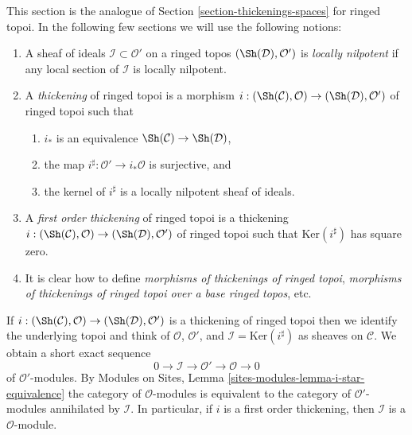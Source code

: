\noindent
This section is the analogue of Section \ref{section-thickenings-spaces}
for ringed topoi.
In the following few sections we will use the following notions:
\begin{enumerate}
\item A sheaf of ideals $\mathcal{I} \subset \mathcal{O}'$ on
a ringed topos $(\Sh(\mathcal{D}), \mathcal{O}')$ is {\it locally nilpotent}
if any local section of $\mathcal{I}$ is locally nilpotent.
\item A {\it thickening} of ringed topoi is a morphism
$i : (\Sh(\mathcal{C}), \mathcal{O}) \to (\Sh(\mathcal{D}), \mathcal{O}')$
of ringed topoi such that
\begin{enumerate}
\item $i_*$ is an equivalence $\Sh(\mathcal{C}) \to \Sh(\mathcal{D})$,
\item the map $i^\sharp : \mathcal{O}' \to i_*\mathcal{O}$
is surjective, and
\item the kernel of $i^\sharp$ is a locally nilpotent sheaf of ideals.
\end{enumerate}
\item A {\it first order thickening} of ringed topoi is a thickening
$i : (\Sh(\mathcal{C}), \mathcal{O}) \to (\Sh(\mathcal{D}), \mathcal{O}')$
of ringed topoi such that $\text{Ker}(i^\sharp)$ has square zero.
\item It is clear how to define
{\it morphisms of thickenings of ringed topoi},
{\it morphisms of thickenings of ringed topoi over a base ringed topos}, etc.
\end{enumerate}
If
$i : (\Sh(\mathcal{C}), \mathcal{O}) \to (\Sh(\mathcal{D}), \mathcal{O}')$
is a thickening of ringed topoi then we identify the underlying topoi
and think of $\mathcal{O}$, $\mathcal{O}'$, and
$\mathcal{I} = \text{Ker}(i^\sharp)$ as sheaves on $\mathcal{C}$.
We obtain a short exact sequence
$$
0 \to \mathcal{I} \to \mathcal{O}' \to \mathcal{O} \to 0
$$
of $\mathcal{O}'$-modules. By
Modules on Sites, Lemma \ref{sites-modules-lemma-i-star-equivalence}
the category of $\mathcal{O}$-modules is equivalent to the category
of $\mathcal{O}'$-modules annihilated by $\mathcal{I}$. In particular,
if $i$ is a first order thickening, then
$\mathcal{I}$ is a $\mathcal{O}$-module.

